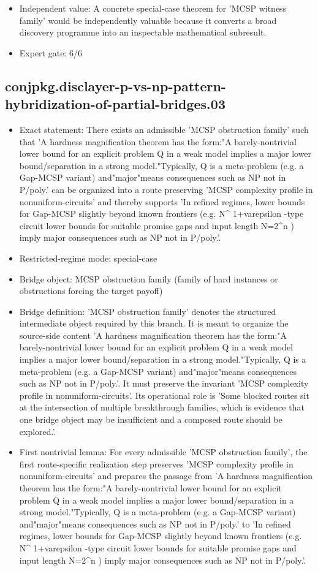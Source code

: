 \documentclass[11pt]{article}
\begin{document}
\begin{itemize}
\item Independent value: A concrete special-case theorem for 'MCSP witness family' would be independently valuable because it converts a broad discovery programme into an inspectable mathematical subresult.
\item Expert gate: 6/6
\end{itemize}

\subsection*{conjpkg.disclayer-p-vs-np-pattern-hybridization-of-partial-bridges.03}
\begin{itemize}
\item Exact statement: There exists an admissible 'MCSP obstruction family' such that 'A hardness magnification theorem has the form:"A barely-nontrivial lower bound for an explicit problem Q in a weak model implies a major lower bound/separation in a strong model."Typically, Q is a meta-problem (e.g. a Gap-MCSP variant) and"major"means consequences such as NP not in P/poly.' can be organized into a route preserving 'MCSP complexity profile in nonuniform-circuits' and thereby supports 'In refined regimes, lower bounds for Gap-MCSP slightly beyond known frontiers (e.g. N\textasciicircum{} 1+varepsilon -type circuit lower bounds for suitable promise gaps and input length N=2\textasciicircum{}n ) imply major consequences such as NP not in P/poly.'.
\item Restricted-regime mode: special-case
\item Bridge object: MCSP obstruction family (family of hard instances or obstructions forcing the target payoff)
\item Bridge definition: 'MCSP obstruction family' denotes the structured intermediate object required by this branch. It is meant to organize the source-side content 'A hardness magnification theorem has the form:"A barely-nontrivial lower bound for an explicit problem Q in a weak model implies a major lower bound/separation in a strong model."Typically, Q is a meta-problem (e.g. a Gap-MCSP variant) and"major"means consequences such as NP not in P/poly.'. It must preserve the invariant 'MCSP complexity profile in nonuniform-circuits'. Its operational role is 'Some blocked routes sit at the intersection of multiple breakthrough families, which is evidence that one bridge object may be insufficient and a composed route should be explored.'.
\item First nontrivial lemma: For every admissible 'MCSP obstruction family', the first route-specific realization step preserves 'MCSP complexity profile in nonuniform-circuits' and prepares the passage from 'A hardness magnification theorem has the form:"A barely-nontrivial lower bound for an explicit problem Q in a weak model implies a major lower bound/separation in a strong model."Typically, Q is a meta-problem (e.g. a Gap-MCSP variant) and"major"means consequences such as NP not in P/poly.' to 'In refined regimes, lower bounds for Gap-MCSP slightly beyond known frontiers (e.g. N\textasciicircum{} 1+varepsilon -type circuit lower bounds for suitable promise gaps and input length N=2\textasciicircum{}n ) imply major consequences such as NP not in P/poly.'.

\end{itemize}
\end{document}
